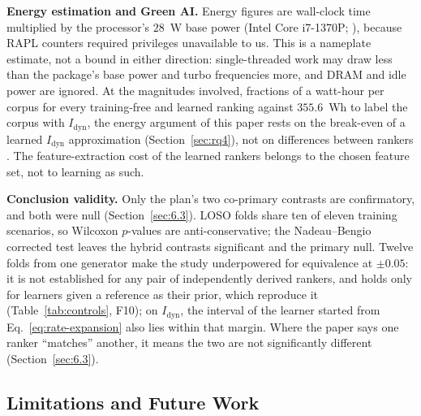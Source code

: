 \noindent\textbf{Energy estimation and Green AI.} Energy figures are wall-clock time multiplied by the processor's $28$~W base power (Intel Core i7-1370P; ), because RAPL counters required privileges unavailable to us. This is a nameplate estimate, not a bound in either direction: single-threaded work may draw less than the package's base power and turbo frequencies more, and DRAM and idle power are ignored. At the magnitudes involved, fractions of a watt-hour per corpus for every training-free and learned ranking against $355.6$~Wh to label the corpus with $I_{\text{dyn}}$, the energy argument of this paper rests on the break-even of a learned $I_{\text{dyn}}$ approximation (Section~\ref{sec:rq4}), not on differences between rankers \cite{schwartz2020greenai,verdecchia2023greenai}. The feature-extraction cost of the learned rankers belongs to the chosen feature set, not to learning as such.

\noindent\textbf{Conclusion validity.} Only the plan's two co-primary contrasts are confirmatory, and both were null (Section~\ref{sec:6.3}). LOSO folds share ten of eleven training scenarios, so Wilcoxon $p$-values are anti-conservative; the Nadeau--Bengio corrected test leaves the hybrid contrasts significant and the primary null. Twelve folds from one generator make the study underpowered for equivalence at $\pm 0.05$: it is not established for any pair of independently derived rankers, and holds only for learners given a reference as their prior, which reproduce it (Table~\ref{tab:controls}, F10); on $I_{\text{dyn}}$, the interval of the learner started from Eq.~\eqref{eq:rate-expansion} also lies within that margin. Where the paper says one ranker ``matches'' another, it means the two are not significantly different (Section~\ref{sec:6.3}).

\subsection{Limitations and Future Work}
\label{sec:8.4}
\label{sec:limitations}

